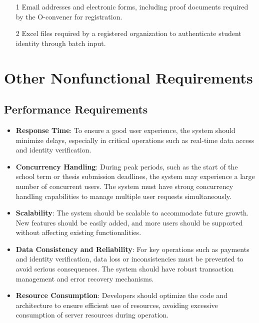 \begin{itemize}
    \item[1]Email addresses and electronic forms, including proof documents required by the O-convener for registration.
    \item[2] Excel files required by a registered organization to authenticate student identity through batch input.
\end{itemize}

\chapter{Other Nonfunctional Requirements}

\section{Performance Requirements}
\begin{itemize}
    \item \textbf{Response Time}: To ensure a good user experience, the system should minimize delays, especially in critical operations such as real-time data access and identity verification.
    \item \textbf{Concurrency Handling}: During peak periods, such as the start of the school term or thesis submission deadlines, the system may experience a large number of concurrent users. The system must have strong concurrency handling capabilities to manage multiple user requests simultaneously.
    \item \textbf{Scalability}: The system should be scalable to accommodate future growth. New features should be easily added, and more users should be supported without affecting existing functionalities.
    \item \textbf{Data Consistency and Reliability}: For key operations such as payments and identity verification, data loss or inconsistencies must be prevented to avoid serious consequences. The system should have robust transaction management and error recovery mechanisms.
    \item \textbf{Resource Consumption}: Developers should optimize the code and architecture to ensure efficient use of resources, avoiding excessive consumption of server resources during operation.
\end{itemize}

